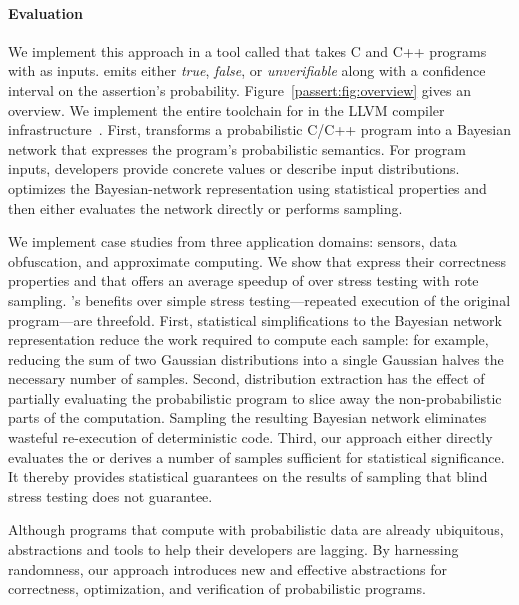 \paragraph*{Evaluation}
We implement this approach in a tool called \tool that takes C and C++
programs with \passerts as inputs. \tool emits either \emph{true},
\emph{false}, or \emph{unverifiable} along with a confidence interval
on the assertion's probability.  Figure~\ref{passert:fig:overview} gives an
overview.  We implement the entire toolchain for \tool in the LLVM
compiler infrastructure~\cite{llvm}.  First, \tool transforms a
probabilistic C/C++ program into a Bayesian network that expresses the
program's probabilistic semantics. For program inputs, developers
provide concrete values or describe input distributions. \tool
optimizes the Bayesian-network
representation using statistical properties and then either
evaluates the network directly or performs sampling.

We implement case
studies from three application domains: sensors, data obfuscation, and
approximate computing.  We show that \passerts express their
correctness properties and that \mayhap offers an average speedup of
 over stress testing with rote
sampling.
\tool's benefits over simple stress testing---repeated execution of
the original program---are threefold. First, statistical
simplifications to the Bayesian network representation reduce the work
required to compute each sample:
for example, reducing the sum of two
Gaussian distributions into a single Gaussian halves the necessary
number of samples.
Second, distribution extraction has the effect of
partially evaluating the probabilistic program to slice away the
non-probabilistic parts of the computation. Sampling the resulting
Bayesian network eliminates wasteful re-execution of deterministic
code. Third, our approach either directly evaluates the \passert or derives
a number of samples sufficient for statistical significance.
It thereby provides statistical guarantees
on the results of sampling that blind stress testing does not guarantee.

Although programs that compute with probabilistic data are already
ubiquitous, abstractions and tools to help their developers are
lagging.  By harnessing randomness, our approach introduces new and
effective abstractions for correctness, optimization, and
verification of probabilistic programs.

